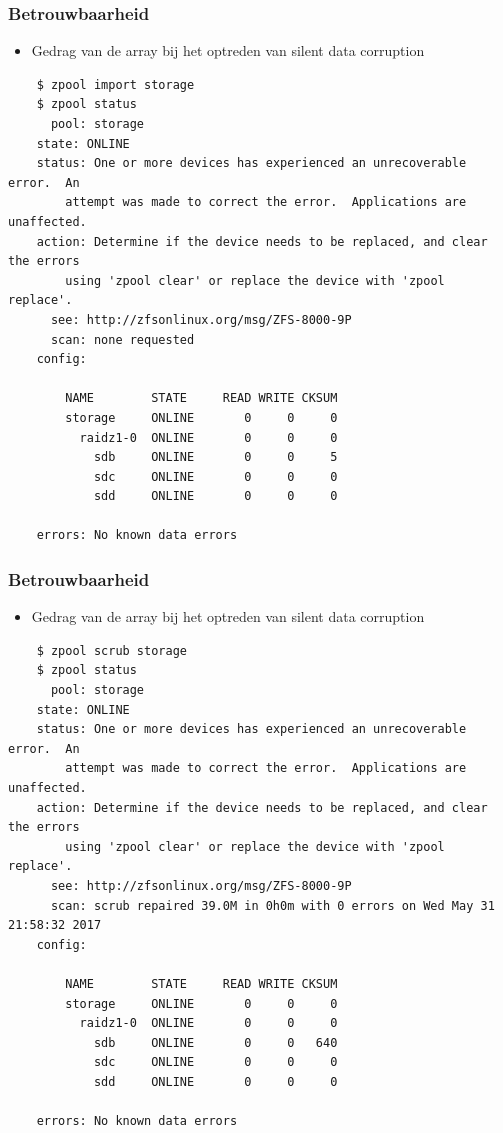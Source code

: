 \documentclass{beamer}
\begin{document}
\begin{frame}[fragile]
  \frametitle{Betrouwbaarheid}
  \begin{itemize}
    \item Gedrag van de array bij het optreden van silent data corruption
  \end{itemize}
  \begin{verbatim}
    $ zpool import storage
    $ zpool status
      pool: storage
    state: ONLINE
    status: One or more devices has experienced an unrecoverable error.  An
	    attempt was made to correct the error.  Applications are unaffected.
    action: Determine if the device needs to be replaced, and clear the errors
	    using 'zpool clear' or replace the device with 'zpool replace'.
      see: http://zfsonlinux.org/msg/ZFS-8000-9P
      scan: none requested
    config:

	    NAME        STATE     READ WRITE CKSUM
	    storage     ONLINE       0     0     0
	      raidz1-0  ONLINE       0     0     0
	        sdb     ONLINE       0     0     5
	        sdc     ONLINE       0     0     0
	        sdd     ONLINE       0     0     0

    errors: No known data errors
  \end{verbatim}
\end{frame}

\begin{frame}[fragile]
  \frametitle{Betrouwbaarheid}
  \begin{itemize}
    \item Gedrag van de array bij het optreden van silent data corruption
  \end{itemize}
  \begin{verbatim}
    $ zpool scrub storage
    $ zpool status 
      pool: storage
    state: ONLINE
    status: One or more devices has experienced an unrecoverable error.  An
	    attempt was made to correct the error.  Applications are unaffected.
    action: Determine if the device needs to be replaced, and clear the errors
	    using 'zpool clear' or replace the device with 'zpool replace'.
      see: http://zfsonlinux.org/msg/ZFS-8000-9P
      scan: scrub repaired 39.0M in 0h0m with 0 errors on Wed May 31 21:58:32 2017
    config:

	    NAME        STATE     READ WRITE CKSUM
	    storage     ONLINE       0     0     0
	      raidz1-0  ONLINE       0     0     0
	        sdb     ONLINE       0     0   640
	        sdc     ONLINE       0     0     0
	        sdd     ONLINE       0     0     0

    errors: No known data errors

  \end{verbatim}
\end{frame}
\end{document}
